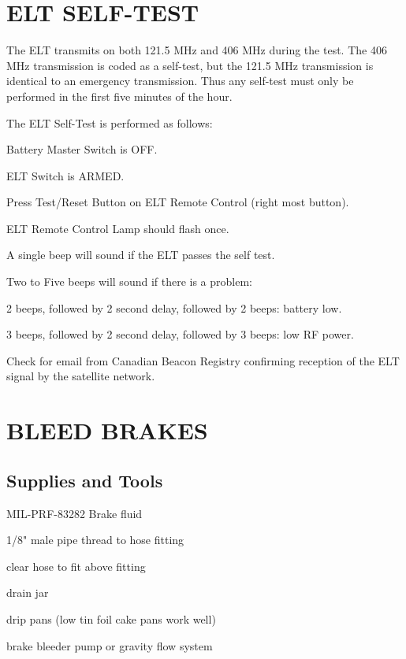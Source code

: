 \section{ELT SELF-TEST}
\begin{Note}[NOTE]
  The ELT transmits on both 121.5 MHz and 406 MHz during the test.  The 406 MHz transmission is coded as a self-test, but the 121.5 MHz transmission is identical to an emergency transmission.  Thus any self-test must only be performed in the first five minutes of the hour.
  \end{Note}
The ELT Self-Test is performed as follows:
\begin{enumerate*}
	\item Battery Master Switch is OFF.
	\item ELT Switch is ARMED.
	\item Press Test/Reset Button on ELT Remote Control (right most button).
	\item ELT Remote Control Lamp should flash once.
	\item A single beep will sound if the ELT passes the self test.
	\item Two to Five beeps will sound if there is a problem:
	\begin{enumerate*}
	  \item 2 beeps, followed by 2 second delay, followed by 2 beeps: battery low.
	  \item 3 beeps, followed by 2 second delay, followed by 3 beeps: low RF power.
	  \end{enumerate*}
	\item Check for email from Canadian Beacon Registry confirming reception of the ELT signal by the satellite network.
\end{enumerate*}

\section{BLEED BRAKES}
  \subsection{Supplies and Tools}
    \begin{enumerate*}
      \item MIL-PRF-83282 Brake fluid
      \item 1/8" male pipe thread to hose fitting
      \item clear hose to fit above fitting
      \item drain jar
      \item drip pans (low tin foil cake pans work well)
      \item brake bleeder pump or gravity flow system
  \end{enumerate*}
